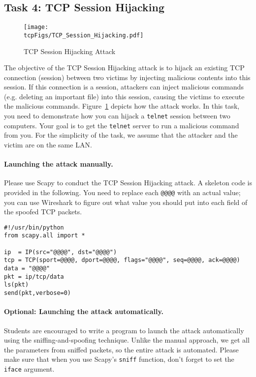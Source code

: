             

\subsection{Task 4: TCP Session Hijacking}



\begin{figure}[htb]
  \begin{center}
    \texttt{[image: \\tcpFigs/TCP\_Session\_Hijacking.pdf]}
  \end{center}
  \caption{TCP Session Hijacking Attack}
  \label{tcp:fig:hijacking}
\end{figure}
 
   
The objective of the TCP Session Hijacking attack is to hijack an 
existing TCP connection (session) between two victims by injecting malicious contents
into this session. If this connection is a \telnet session, attackers
can inject malicious commands (e.g. deleting an important file) 
into this session, causing the victims 
to execute the malicious commands. 
Figure~\ref{tcp:fig:hijacking} depicts how the attack works.
In this task, you need to demonstrate how you can hijack a 
\texttt{telnet} session between two computers. Your goal is to get the
\texttt{telnet} server to run a malicious command from you.
For the simplicity of the task, we assume that 
the attacker and the victim are on the same LAN.


\paragraph{Launching the attack manually.}
Please use Scapy to conduct the TCP Session Hijacking attack.
A skeleton code is provided in the following. You need to replace each
\texttt{@@@@} with an actual value; you can use Wireshark to figure out what value you 
should put into each field of the spoofed TCP packets. 


\begin{lstlisting}
#!/usr/bin/python
from scapy.all import *

ip  = IP(src="@@@@", dst="@@@@")
tcp = TCP(sport=@@@@, dport=@@@@, flags="@@@@", seq=@@@@, ack=@@@@)
data = "@@@@"
pkt = ip/tcp/data
ls(pkt)
send(pkt,verbose=0)
\end{lstlisting}


\paragraph{Optional: Launching the attack automatically.}
Students are encouraged to write a program to launch the
attack automatically using the sniffing-and-spoofing technique.
Unlike the manual approach, we get all the parameters
from sniffed packets, so the entire attack is automated.
Please make sure that when you
use Scapy's \texttt{sniff} function, don't forget to
set the \texttt{iface} argument.




